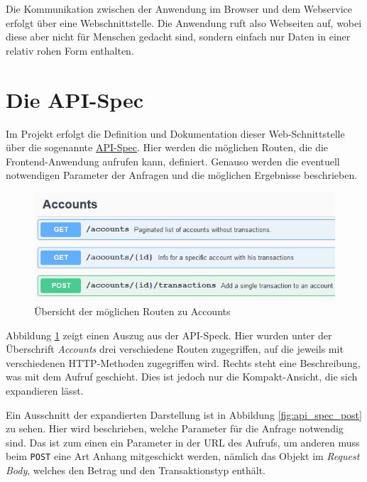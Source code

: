 \documentclass[a4paper, 11pt]{article}
\begin{document}
Die Kommunikation zwischen der Anwendung im Browser und dem Webservice erfolgt
über eine Webschnittstelle. Die Anwendung ruft also Webseiten auf, wobei diese
aber nicht für Menschen gedacht sind, sondern einfach nur Daten in einer
relativ rohen Form enthalten.

\section{Die API-Spec}

Im Projekt erfolgt die Definition und Dokumentation dieser Web-Schnittstelle
über die sogenannte \href{https://wwi16ama.feste-ip.net/swagger/}{API-Spec}.
Hier werden die möglichen Routen, die die Frontend-Anwendung aufrufen kann,
definiert. Genauso werden die eventuell notwendigen Parameter der Anfragen und
die möglichen Ergebnisse beschrieben.

\begin{figure}[htpb]
    \centering
    \includegraphics{images/api_spec_example_short.png}
    \caption{Übersicht der möglichen Routen zu Accounts}
    \label{fig:api_spec_accs}
\end{figure}

Abbildung \ref{fig:api_spec_accs} zeigt einen Auszug aus der API-Speck. Hier
wurden unter der Überschrift \emph{Accounts} drei verschiedene Routen
zugegriffen, auf die jeweils mit verschiedenen HTTP-Methoden zugegriffen wird.
Rechts steht eine Beschreibung, was mit dem Aufruf geschieht. Dies ist jedoch nur die Kompakt-Ansicht, die sich expandieren lässt.

Ein Ausschnitt der expandierten Darstellung ist in Abbildung
\ref{fig:api_spec_post} zu sehen. Hier wird beschrieben, welche Parameter für
die Anfrage notwendig sind. Das ist zum einen ein Parameter in der URL des
Aufrufs, um anderen muss beim \texttt{POST} eine Art Anhang mitgeschickt
werden, nämlich das Objekt im \emph{Request Body}, welches den Betrag und den
Transaktionstyp enthält.
\end{document}
